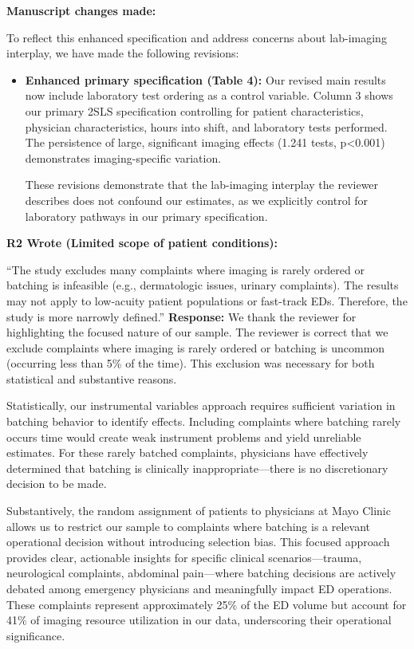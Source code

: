 \documentclass[11pt]{article}
\newenvironment{quote2}
{ \bigskip
\noindent
         \small\em
         \baselineskip=14pt
}
\newcommand{\1}{\hbox{\rm 1\kern-.35em 1}}
\begin{document}
\textbf{Manuscript changes made:}

To reflect this enhanced specification and address concerns about lab-imaging interplay, we have made the following revisions:

\begin{itemize}
\item \textbf{Enhanced primary specification (Table 4):} Our revised main results now include laboratory test ordering as a control variable. Column 3 shows our primary 2SLS specification controlling for patient characteristics, physician characteristics, hours into shift, and laboratory tests performed. The persistence of large, significant imaging effects (1.241 tests, p<0.001) demonstrates imaging-specific variation.

These revisions demonstrate that the lab-imaging interplay the reviewer describes does not confound our estimates, as we explicitly control for laboratory pathways in our primary specification.
\end{itemize}
\color{black}



\begin{quote2}
\textbf{R2 Wrote (Limited scope of patient conditions):}  
 
\noindent``The study excludes many complaints where imaging is rarely ordered or batching is infeasible (e.g., dermatologic issues, urinary complaints). The results may not apply to low-acuity patient populations or fast-track EDs. Therefore, the study is more narrowly defined.'' 
\end{quote2}

\noindent\textbf{Response:} \color{blue}We thank the reviewer for highlighting the focused nature of our sample. The reviewer is correct that we exclude complaints where imaging is rarely ordered or batching is uncommon (occurring less than 5\% of the time). This exclusion was necessary for both statistical and substantive reasons.

Statistically, our instrumental variables approach requires sufficient variation in batching behavior to identify effects. Including complaints where batching rarely occurs time would create weak instrument problems and yield unreliable estimates. For these rarely batched complaints, physicians have effectively determined that batching is clinically inappropriate—there is no discretionary decision to be made.

Substantively, the random assignment of patients to physicians at Mayo Clinic allows us to restrict our sample to complaints where batching is a relevant operational decision without introducing selection bias. This focused approach provides clear, actionable insights for specific clinical scenarios—trauma, neurological complaints, abdominal pain—where batching decisions are actively debated among emergency physicians and meaningfully impact ED operations. These complaints represent approximately 25\% of the ED volume but account for 41\% of imaging resource utilization in our data, underscoring their operational significance.
\end{document}
